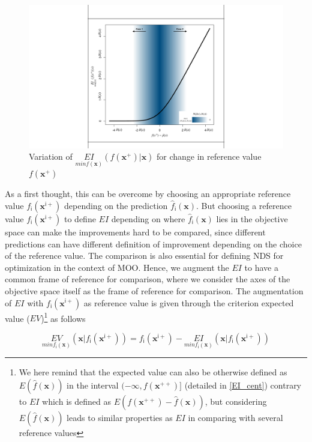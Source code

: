 \begin{figure}[h!]
    \centering
    \includegraphics[scale=0.3]{Chapter5/Pictures/Cases_EI.pdf}
    \caption{Variation of $\underset{min f(\bm x)}{EI}(f(\bm x^+)|\bm x)$ for change in reference value $f(\bm x^+)$}
    \label{fig:cases_ei}
\end{figure}

As a first thought, this can be overcome by choosing an appropriate reference value $f_{\mathsf{i}}(\bm x^{\mathsf{i}+})$ depending on the prediction $\hat{f}_{\mathsf{i}}(\bm{x})$. But choosing a reference value $f_{\mathsf{i}}(\bm x^{\mathsf{i}+})$ to define $EI$ depending on where $\hat{f}_{\mathsf{i}}(\bm{x})$ lies in the objective space can make the improvements hard to be compared, since different predictions can have different definition of improvement depending on the choice of the reference value. 
The comparison is also essential for defining NDS for optimization in the context of MOO.
Hence, we augment the $EI$ to have a common frame of reference for comparison, where we consider the axes of the objective space itself as the frame of reference for comparison. The augmentation of $EI$ with $f_{\mathsf{i}}(\bm x^{\mathsf{i}+})$ as reference value is given through the criterion expected value ($EV$)\footnote{We here remind that the expected value can also be otherwise defined as $E(\hat{f}(\bm x))$ in the interval $(-\infty,{f}(\bm x^{++})]$ (detailed in \eqref{EI_cent}) contrary to $EI$ which is defined as $E(f(\bm{x}^{++})-\hat{f}(\bm x))$, but considering $E(\hat{f}(\bm x))$ leads to similar properties as $EI$ in comparing with several reference values} as follows

\begin{equation}
\underset{min f_{\mathsf{i}}(\bm{x})}{EV}(\bm{x}|f_{\mathsf{i}}(\bm x^{\mathsf{i}+})) = f_{\mathsf{i}}(\bm x^{\mathsf{i}+})-\underset{min f_{\mathsf{i}}(\bm{x})}{EI}(\bm{x}| f_{\mathsf{i}}(\bm x^{\mathsf{i}+}))
\label{EV-EI}
\end{equation}

